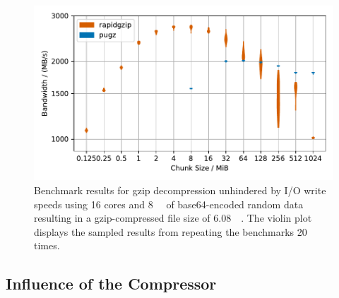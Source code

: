 \begin{figure}
    \centering
    \includegraphics[width=\linewidth]{plots/decompression-chunk-size-bandwidths-number-of-threads.pdf}
    \caption{
        Benchmark results for gzip decompression unhindered by I/O write speeds using \num{16} cores and \SI{8}{\gibi\byte} of base64-encoded random data resulting in a gzip-compressed file size of \SI{6.08}{\gibi\byte}.
        The violin plot displays the sampled results from repeating the benchmarks 20 times.
    }
    \label{fig:chunk-size}
\end{figure}



\subsection{Influence of the Compressor}
\label{sct:gzip-compressors}


